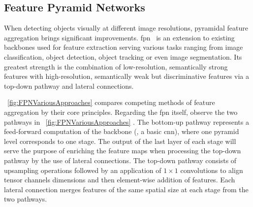 \subsection{Feature Pyramid Networks}
\label{ssec:FeaturePyramidNetworks}

When detecting objects visually at different image resolutions, pyramidal feature aggregation brings significant improvements. \Gls{fpn}~\cite{lin2017fpn} is an extension to existing backbones used for feature extraction serving various tasks ranging from image classification, object detection, object tracking or even image segmentation. Its greatest strength is the combination of low-resolution, semantically strong features with high-resolution, semantically weak but discriminative features via a top-down pathway and lateral connections.

\figtext{}~\ref{fig:FPNVariousApproaches} compares competing methods of feature aggregation by their core principles. Regarding the \gls{fpn} itself, observe the two pathways in \figtext{}~\ref{fig:FPNVariousApproaches} . The bottom-up pathway represents a feed-forward computation of the backbone (\egtext{}, a basic \gls{cnn}), where one pyramid level corresponds to one stage. The output of the last layer of each stage will serve the purpose of enriching the feature maps when processing the top-down pathway by the use of lateral connections. The top-down pathway consists of upsampling operations followed by an application of $1 \times 1$ convolutions to align tensor channels dimensions and then element-wise addition of features. Each lateral connection merges features of the same spatial size at each stage from the two pathways.

